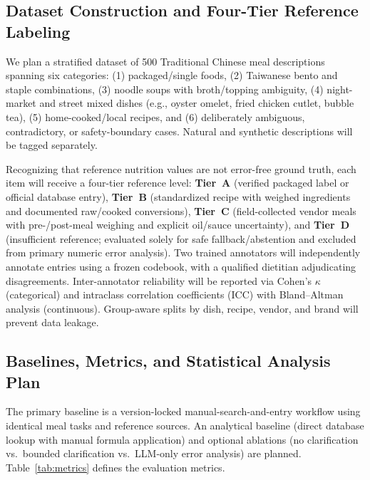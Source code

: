 \documentclass[conference]{IEEEtran}
\begin{document}
\subsection{Dataset Construction and Four-Tier Reference Labeling}
We plan a stratified dataset of 500 Traditional Chinese meal descriptions spanning six categories: (1) packaged/single foods, (2) Taiwanese bento and staple combinations, (3) noodle soups with broth/topping ambiguity, (4) night-market and street mixed dishes (e.g., oyster omelet, fried chicken cutlet, bubble tea), (5) home-cooked/local recipes, and (6) deliberately ambiguous, contradictory, or safety-boundary cases. Natural and synthetic descriptions will be tagged separately.

Recognizing that reference nutrition values are not error-free ground truth, each item will receive a four-tier reference level: \textbf{Tier~A} (verified packaged label or official database entry), \textbf{Tier~B} (standardized recipe with weighed ingredients and documented raw/cooked conversions), \textbf{Tier~C} (field-collected vendor meals with pre-/post-meal weighing and explicit oil/sauce uncertainty), and \textbf{Tier~D} (insufficient reference; evaluated solely for safe fallback/abstention and excluded from primary numeric error analysis). Two trained annotators will independently annotate entries using a frozen codebook, with a qualified dietitian adjudicating disagreements. Inter-annotator reliability will be reported via Cohen's $\kappa$ (categorical) and intraclass correlation coefficients (ICC) with Bland--Altman analysis (continuous). Group-aware splits by dish, recipe, vendor, and brand will prevent data leakage.

\subsection{Baselines, Metrics, and Statistical Analysis Plan}
The primary baseline is a version-locked manual-search-and-entry workflow using identical meal tasks and reference sources. An analytical baseline (direct database lookup with manual formula application) and optional ablations (no clarification vs.\ bounded clarification vs.\ LLM-only error analysis) are planned. Table~\ref{tab:metrics} defines the evaluation metrics.
\end{document}
